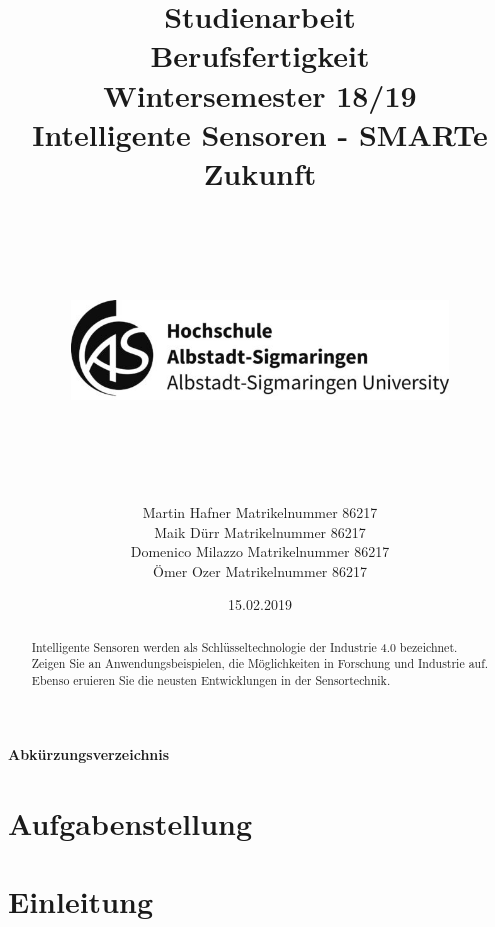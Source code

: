 \documentclass[a4paper,10pt]{scrartcl}
\begin{document}
\title{Studienarbeit \vspace{50px} \hfill \\ Berufsfertigkeit\\ Wintersemester 18/19 \vspace{20px} \hfill \\  \vspace{50px} 
Intelligente Sensoren - SMARTe Zukunft \hfill \\ \hfill \\
\hfill \\ 
\begin{center}
\includegraphics[width=10cm]{picture/hs_albsig_logo}
\end{center}
\hfill \\  \vspace{50px}
}


\author{Martin Hafner Matrikelnummer 86217 \hfill \\
Maik Dürr Matrikelnummer 86217 \hfill \\
Domenico Milazzo Matrikelnummer 86217 \hfill \\
Ömer Ozer Matrikelnummer 86217 \hfill \\}
\date{15.02.2019}
\maketitle
\thispagestyle{empty}
\clearpage
\tableofcontents
\listoffigures
\listoftables
\paragraph{\Large{Abkürzungsverzeichnis}}
\begin{acronym}[Bash]
\end{acronym}
\onehalfspacing

\section{Aufgabenstellung}
\begin{abstract}
Intelligente Sensoren werden als Schlüsseltechnologie der Industrie 4.0 bezeichnet. Zeigen Sie an Anwendungsbeispielen, die Möglichkeiten in Forschung und Industrie auf. Ebenso eruieren Sie die neusten Entwicklungen in der Sensortechnik.
\end{abstract}


\section{Einleitung}

\setcounter{page}{1}

\newpage



\clearpage

\end{document}
